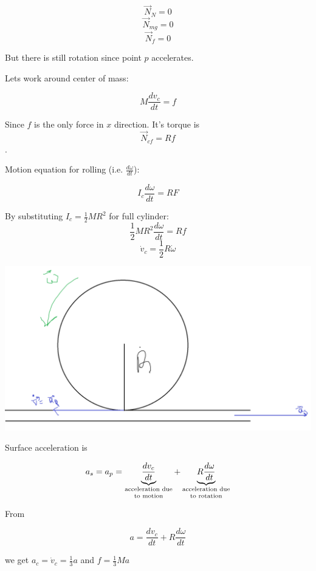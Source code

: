 $$\vec{N}_N = 0$$
$$\vec{N}_{mg} = 0$$
$$\vec{N}_{f} = 0$$

But there is still rotation since point $p$ accelerates.

Lets work around center of mass:

$$M\frac{dv_c}{dt} = f$$

Since $f$ is the only force in $x$ direction. It's torque is
$$\vec{N}_{cf} = Rf$$.

Motion equation for rolling (i.e. $\frac{d\omega}{dt}$):

$$I_c\frac{d\omega}{dt} = RF$$

By substituting $I_c = \frac{1}{2}MR^2$ for full cylinder:
$$\frac{1}{2}MR^2 \frac{d\omega}{dt} = Rf$$
$$\dot{v}_c = \frac{1}{2}R\dot{\omega}$$

\begin{center}
	\includegraphics[width=\linewidth]{./lect18/pic3.png}
\end{center}

Surface acceleration is

$$a_s = a_p =\underbrace{ \frac{dv_c}{dt}}_{\parbox{2cm}{\centering \scriptsize acceleration due to motion}} + \underbrace{R\frac{d \omega}{dt}}_{\parbox{2cm}{\centering \scriptsize acceleration due to rotation}}$$

From

$$a = \frac{dv_c}{dt}+ R\frac{d\omega}{dt}$$

we get   $a_c = \dot{v}_c =\frac{1}{3}a$ and $f = \frac{1}{3}Ma$

